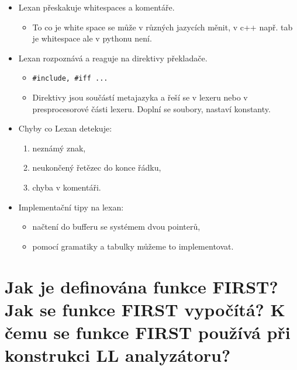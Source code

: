 \documentclass{article}
\begin{document}
\begin{itemize}
  \item Lexan přeskakuje whitespaces a komentáře.
  \begin{itemize}
    \item To co je white space se může v různých jazycích měnit, v c++ např. tab je whitespace ale v pythonu není.
  \end{itemize}
  \item Lexan rozpoznává a reaguje na direktivy překladače.
  \begin{itemize}
    \item \verb|#include, #iff ...|
    \item Direktivy jsou součástí metajazyka a řeší se v lexeru nebo v presprocesorové části lexeru. Doplní se soubory, nastaví konstanty. 
  \end{itemize}
  \item Chyby co Lexan detekuje:
  \begin{enumerate}
    \item neznámý znak,
    \item neukončený řetězec do konce řádku,
    \item chyba v komentáři.
  \end{enumerate}
  \item Implementační tipy na lexan:
  \begin{itemize}
    \item načtení do bufferu se systémem dvou pointerů,
    \item pomocí gramatiky a tabulky můžeme to implementovat.
  \end{itemize}
\end{itemize}
\newpage

\section{Jak je definována funkce FIRST? Jak se funkce FIRST vypočítá? K čemu se funkce FIRST používá při konstrukci LL analyzátoru?}
\end{document}
